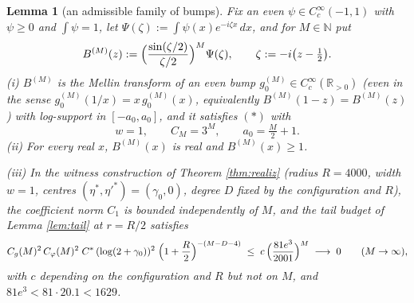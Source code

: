 \documentclass[11pt,reqno]{amsart}
\newtheorem{lemma}[theorem]{Lemma}
\theoremstyle{definition}
\newcommand{\R}{\mathbb{R}}
\newcommand{\N}{\mathbb{N}}
\begin{document}
\begin{lemma}[an admissible family of bumps]\label{hyp:pw}
Fix an even \(\psi\in C_c^\infty(-1,1)\) with \(\psi\geq0\) and
\(\int\psi=1\), let \(\Psi(\zeta):=\int\psi(x)e^{-i\zeta x}\,dx\), and for
\(M\in\N\) put
\[
B^{(M)}(z):=\Bigl(\frac{\sin(\zeta/2)}{\zeta/2}\Bigr)^{M}\Psi(\zeta),
\qquad \zeta:=-i\bigl(z-\tfrac12\bigr).
\]
\textup{(i)} \(B^{(M)}\) is the Mellin transform of an even bump
\(g_0^{(M)}\in C_c^\infty(\R_{>0})\) \textup{(}even in the sense
\(g_0^{(M)}(1/x)=x\,g_0^{(M)}(x)\), equivalently \(B^{(M)}(1-z)=B^{(M)}(z)\)\textup{)}
with log-support in \([-a_0,a_0]\), and it satisfies \((\ast)\) with
\[
w=1,\qquad C_M=3^M,\qquad a_0=\tfrac M2+1 .
\]
\textup{(ii)} For every real \(x\), \(B^{(M)}(x)\) is real and
\(B^{(M)}(x)\geq1\).

\textup{(iii)} In the witness construction of Theorem \ref{thm:realiz}
\textup{(}radius \(R=4000\), width \(w=1\), centres
\((\eta^*,\eta'^*)=(\gamma_0,0)\), degree \(D\) fixed by the configuration and
\(R\)\textup{)}, the coefficient norm \(C_1\) is bounded independently of
\(M\), and the tail budget of Lemma \ref{lem:tail} at \(r=R/2\) satisfies
\[
C_g(M)^2\,C_\varphi(M)^2\;C^*\,(\log(2+\gamma_0))^2\;\Bigl(1+\frac R2\Bigr)^{-(M-D-4)}
\;\leq\;c\,\Bigl(\frac{81e^3}{2001}\Bigr)^{M}\;\longrightarrow\;0
\qquad(M\to\infty),
\]
with \(c\) depending on the configuration and \(R\) but not on \(M\), and
\(81e^3<81\cdot 20.1<1629\).
\end{lemma}
\end{document}
